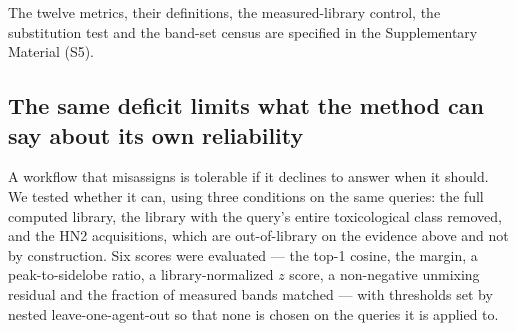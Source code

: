 \documentclass[review,12pt]{elsarticle}
\begin{document}
The twelve metrics, their definitions, the measured-library control, the substitution test and the band-set census are specified in the Supplementary Material (S5).

\subsection{The same deficit limits what the method can say about its own reliability}
\label{sec:abstention}

A workflow that misassigns is tolerable if it declines to answer when it should. We tested
whether it can, using three conditions on the same queries: the full computed library, the
library with the query's entire toxicological class removed, and the HN2 acquisitions,
which are out-of-library on the evidence above and not by construction. Six scores were
evaluated --- the top-1 cosine, the margin, a peak-to-sidelobe ratio, a library-normalized
$z$ score, a non-negative unmixing residual and the fraction of measured bands matched ---
with thresholds set by nested leave-one-agent-out so that none is chosen on the queries it
is applied to.
\end{document}
